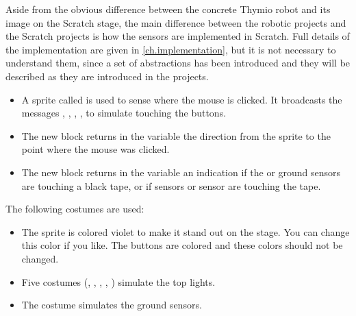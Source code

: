 
Aside from the obvious difference between the concrete Thymio robot and
its image on the Scratch stage, the main difference between the robotic
projects and the Scratch projects is how the sensors are implemented in
Scratch. Full details of the implementation are given in
\cref{ch.implementation}, but it is not necessary to understand them,
since a set of abstractions has been introduced and they will be
described as they are introduced in the projects.

\begin{itemize}

\item A sprite called  is used to sense where the mouse is
clicked. It broadcasts the messages , , ,
,  to simulate touching the buttons.

\item The new block  returns in the
variable  the direction from the
 sprite to the point where the mouse was clicked.

\item The new block  returns in the variable
 an indication if the  or  ground
sensors are touching a black tape, or if  sensors or 
sensor are touching the tape.

\end{itemize}

The following costumes are used:

\begin{itemize}

\item The  sprite is colored violet to make it stand out on the
stage. You can change this color if you like. The buttons are colored and these
colors should not be changed.

\item Five costumes (, , , ,
) simulate the top lights.

\item The costume  simulates the ground sensors.

\end{itemize}
